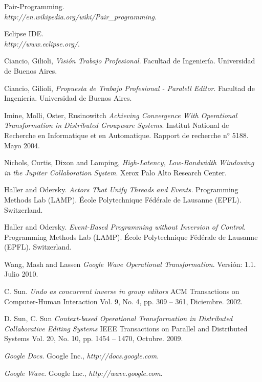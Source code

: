 \documentclass[12pt,a4paper]{article}
\begin{document}
\newpage
\begin{thebibliography}{9}
	Pair-Programming. \\
	\textsl{http://en.wikipedia.org/wiki/Pair\_programming}.

	Eclipse IDE. \\
	\textsl{http://www.eclipse.org/}.

	Ciancio, Gilioli,
	\emph{Visión Trabajo Profesional}.
	Facultad de Ingeniería.
	Universidad de Buenos Aires. 

	Ciancio, Gilioli,
	\emph{Propuesta de Trabajo Profesional - Paralell Editor}.
	Facultad de Ingeniería.
	Universidad de Buenos Aires. 

	Imine, Molli, Oster, Rusinowitch
	\emph{Achieving Convergence With Operational Transformation in Distributed Groupware Systems}.
	Institut National de Recherche en Informatique et en Automatique.
	Rapport de recherche n° 5188. 
	Mayo 2004.

	Nichols, Curtis, Dixon and Lamping,
	\emph{High-Latency, Low-Bandwidth Windowing in the Jupiter Collaboration System}.
	Xerox Palo Alto Research Center.

	Haller and Odersky.
	\emph{Actors That Unify Threads and Events.}
	Programming Methods Lab (LAMP).
	École Polytechnique Fédérale de Lausanne (EPFL).
	Switzerland.
 
	Haller and Odersky.
	\emph{Event-Based Programming without Inversion of Control.}
	Programming Methods Lab (LAMP).
	École Polytechnique Fédérale de Lausanne (EPFL).
	Switzerland.

	Wang, Mash and Lassen
	\emph{Google Wave Operational Transformation}.
	Versión: 1.1.
	Julio 2010.

	C. Sun.
	\emph{Undo as concurrent inverse in group editors}
	ACM Transactions on Computer-Human Interaction
	Vol. 9, No. 4, pp. 309 – 361,
	Diciembre. 2002.

	D. Sun, C. Sun
	\emph{Context-based Operational Transformation in Distributed Collaborative Editing Systems}
	IEEE Transactions on Parallel and Distributed Systems
	Vol. 20, No. 10, pp. 1454 – 1470,
	Octubre. 2009.
		
	\emph{Google Docs}. 
	Google Inc., 
	\textsl{http://docs.google.com}.
	
	\emph{Google Wave}. Google Inc., 
	\textsl{http://wave.google.com}.


\end{thebibliography}
\end{document}
